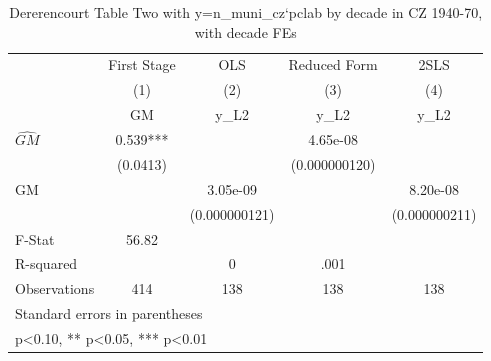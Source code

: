 \begin{table}[htbp]\centering
\def\sym#1{\ifmmode^{#1}\else\(^{#1}\)\fi}
\caption{Dererencourt Table Two with y=n\_muni\_cz`pclab by decade in CZ 1940-70, with decade FEs}
\begin{tabular}{l*{4}{c}}
\toprule
                    & First Stage   &         OLS   &Reduced Form   &        2SLS   \\
                    &\multicolumn{1}{c}{(1)}&\multicolumn{1}{c}{(2)}&\multicolumn{1}{c}{(3)}&\multicolumn{1}{c}{(4)}\\
                    &\multicolumn{1}{c}{GM}&\multicolumn{1}{c}{y\_L2}&\multicolumn{1}{c}{y\_L2}&\multicolumn{1}{c}{y\_L2}\\
\midrule
$\hat{GM}$          &       0.539***&               &    4.65e-08   &               \\
                    &    (0.0413)   &               &(0.000000120)   &               \\
\addlinespace
GM                  &               &    3.05e-09   &               &    8.20e-08   \\
                    &               &(0.000000121)   &               &(0.000000211)   \\
\midrule
F-Stat              &       56.82   &               &               &               \\
R-squared           &               &           0   &        .001   &               \\
Observations        &         414   &         138   &         138   &         138   \\
\bottomrule
\multicolumn{5}{l}{\footnotesize Standard errors in parentheses}\\
\multicolumn{5}{l}{\footnotesize * p<0.10, ** p<0.05, *** p<0.01}\\
\end{tabular}
\end{table}
